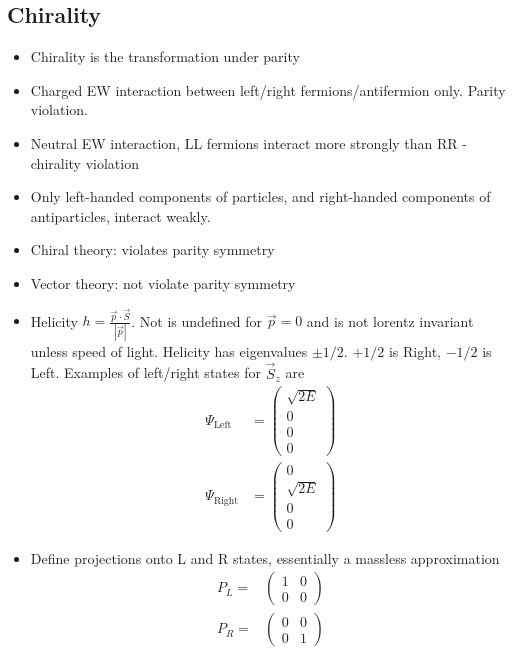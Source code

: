\subsection{Chirality}
\begin{itemize}
    \item Chirality is the transformation under parity
    \item Charged EW interaction between left/right fermions/antifermion only. Parity violation.
    \item Neutral EW interaction, LL fermions interact more strongly than RR - chirality violation
    \item Only left-handed components of particles, and right-handed components of antiparticles, interact weakly.
    \item Chiral theory: violates parity symmetry
    \item Vector theory: not violate parity symmetry
    \item Helicity $h=\frac{\vec{p}\cdot\vec{S}}{|\vec{p}|}$. Not is undefined for $\vec{p}=0$ and is not lorentz invariant unless speed of light. Helicity has eigenvalues $\pm1/2$. $+1/2$ is Right, $-1/2$ is Left. Examples of left/right states for $\vec{S}_z$ are \cite{wells}
        \begin{equation}
        \begin{split}
        \Psi_\text{Left} &= \begin{pmatrix}\sqrt{2E}\\0\\0\\0\end{pmatrix}\\
        \Psi_\text{Right} &= \begin{pmatrix}0\\\sqrt{2E}\\0\\0\end{pmatrix}
        \end{split}
        \end{equation}
    \item Define projections onto L and R states, essentially a massless approximation \cite{wells}
    \begin{equation} \begin{split}
    P_L=&\begin{pmatrix}1&0\\0&0\end{pmatrix} \\
    P_R=&\begin{pmatrix}0&0\\0&1\end{pmatrix} \\

\end{split}
\end{equation}
\end{itemize}
